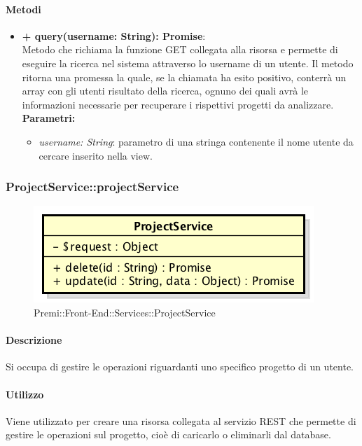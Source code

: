 		\paragraph{Metodi}
		\begin{itemize}
			\item \textbf{+ query(username: String): Promise}:\\
			Metodo che richiama la funzione GET collegata alla risorsa e permette di eseguire la ricerca nel sistema attraverso lo username di un utente. Il metodo ritorna una promessa la quale, se la chiamata ha esito positivo, conterrà un array con gli utenti risultato della ricerca, ognuno dei quali avrà le informazioni necessarie per recuperare i rispettivi progetti da analizzare.\\
			\textbf{Parametri:}\\
			\begin{itemize}
				\item \textit{username: String}: parametro di una stringa contenente il nome utente da cercare inserito nella view.
			\end{itemize}
		\end{itemize}
\newpage
		
		
		\subsubsection{ProjectService::projectService}
		\begin{figure}[h]
			\centering
				\includegraphics[width=0.4\linewidth]{img/premi_front_end_services_projectservice}
			\caption[Premi::Front-End::Services::ProjectService]{Premi::Front-End::Services::ProjectService}
		\end{figure}
		
		\paragraph{Descrizione}
		Si occupa di gestire le operazioni riguardanti uno specifico progetto di un utente.
		
		\paragraph{Utilizzo}
		Viene utilizzato per creare una risorsa collegata al servizio REST che permette di gestire le operazioni sul progetto, cioè di caricarlo o eliminarli dal database.
		
